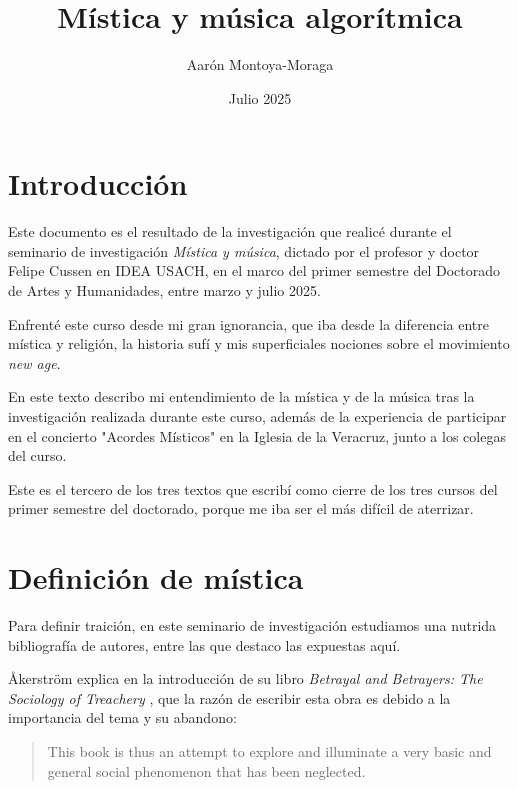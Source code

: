 \documentclass{article}
\title{Mística y música algorítmica}
\author{Aarón Montoya-Moraga}
\date{Julio 2025}
\begin{document}
\maketitle

\renewcommand*\contentsname{Tabla de contenidos}

\tableofcontents

\clearpage

\section{Introducción}

Este documento es el resultado de la investigación que realicé durante el seminario de investigación \textit{Mística y música}, dictado por el profesor y doctor Felipe Cussen en IDEA USACH, en el marco del primer semestre del Doctorado de Artes y Humanidades, entre marzo y julio 2025.

Enfrenté este curso desde mi gran ignorancia, que iba desde la diferencia entre mística y religión, la historia sufí y mis superficiales nociones sobre el movimiento \textit{new age}.

En este texto describo mi entendimiento de la mística y de la música tras la investigación realizada durante este curso, además de la experiencia de participar en el concierto "Acordes Místicos" en la Iglesia de la Veracruz, junto a los colegas del curso.

Este es el tercero de los tres textos que escribí como cierre de los tres cursos del primer semestre del doctorado, porque me iba ser el más difícil de aterrizar.

\clearpage

\section{Definición de mística}

Para definir traición, en este seminario de investigación estudiamos una nutrida bibliografía de autores, entre las que destaco las expuestas aquí.

Åkerström explica en la introducción de su libro \textit{Betrayal and Betrayers: The Sociology of Treachery} , que la razón de escribir esta obra es debido a la importancia del tema y su abandono:

\begin{quote}
This book is thus an attempt to explore and illuminate a very basic and general social phenomenon that has been neglected.\cite[p. x]{betrayalBetrayersAkerstrom}

\end{quote}
\end{document}
